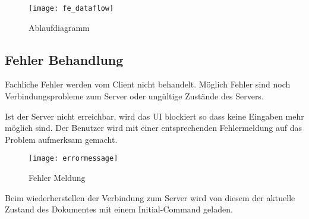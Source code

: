 \begin{figure}[H]
    \texttt{[image: fe\_dataflow]}
    \caption{Ablaufdiagramm}
\end{figure}

\subsection{Fehler Behandlung}
Fachliche Fehler werden vom Client nicht behandelt.
Möglich Fehler sind noch Verbindungsprobleme zum Server oder ungültige Zustände des Servers.

Ist der Server nicht erreichbar, wird das UI blockiert so dass keine Eingaben mehr möglich sind.
Der Benutzer wird mit einer entsprechenden Fehlermeldung auf das Problem aufmerksam gemacht.

\begin{figure}[H]
    \centering
    \texttt{[image: errormessage]}
    \caption{Fehler Meldung}
\end{figure}

Beim wiederherstellen der Verbindung zum Server wird von diesem der aktuelle Zustand des Dokumentes mit einem Initial-Command geladen.
